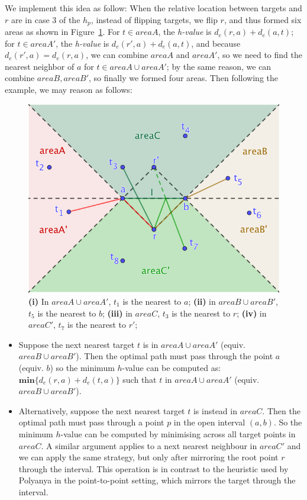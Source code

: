 We implement this idea as follow: 
When the relative location between targets and $r$ are in case 3 of the $h_p$,
instead of flipping targets, we flip $r$, and thus formed six areas as shown in Figure~\ref{fa}.
For $t \in areaA$, the \textit{h-value} is $d_e(r, a) + d_e(a, t)$;
for $t \in areaA'$, the \textit{h-value} is $d_e(r',a) + d_e(a, t)$,
and because $d_e(r', a) = d_e(r, a)$, we can combine $areaA$ and $areaA'$,
so we need to find the nearest neighbor of $a$ for $t \in areaA \cup areaA'$;
by the same reason, we can combine $areaB, areaB'$, so finally we formed four areas.
Then following the example, we may reason as follows:
\begin{figure}[!hbt]
  \centering
  \includegraphics[width=.7\linewidth]{pic/heuristic.png}
  \caption{
    \small  
    \textbf{(i)} In $areaA \cup areaA'$, $t_1$ is the nearest to $a$;
    \textbf{(ii)} in $areaB \cup areaB'$, $t_5$ is the nearest to $b$;
    \textbf{(iii)} in $areaC$, $t_3$ is the nearest to $r$;
    \textbf{(iv)} in $areaC'$, $t_7$ is the nearest to $r'$; 
  }
  \label{fa}
\end{figure}
\begin{itemize}
  \item Suppose the next nearest target $t$ is in $areaA \cup areaA'$ (equiv. $areaB \cup areaB'$).
    Then the optimal path must pass through the point $a$ (equiv. $b$) so the minimum $h$-value can be computed as:
    $\mathbf{min}\{d_e(r, a) + d_e(t, a)\}$ such that $t$ in $areaA \cup areaA'$
    (equiv. $areaB \cup areaB'$).
  \item Alternatively, suppose the next nearest target $t$ is instead in $areaC$.
    Then the optimal path must pass through a point $p$ in the open interval $(a, b)$.
    So the minimum $h$-value can be computed by minimising across all target points in $areaC$.
    A similar argument applies to a next nearest neighbour in $areaC'$ and we can apply the same strategy,
    but only after mirroring the root point $r$ through the interval.
    This operation is in contrast to the heuristic used by Polyanya in the point-to-point setting,
    which mirrors the target through the interval.
\end{itemize}

